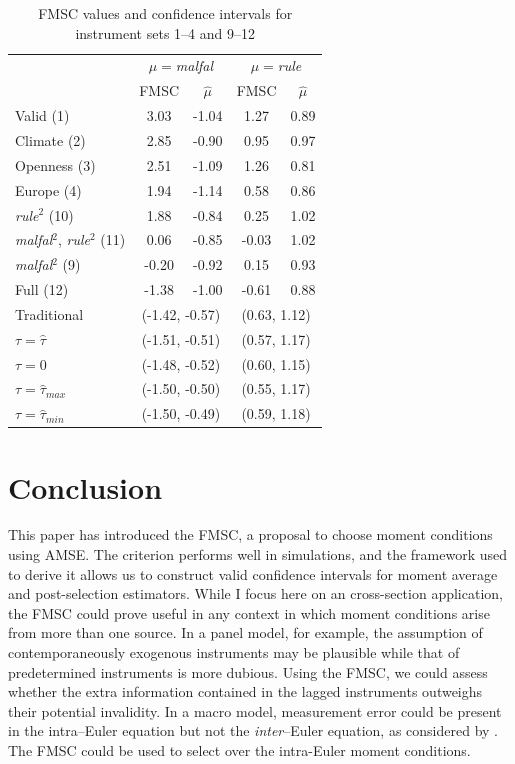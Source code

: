\documentclass[12pt]{article}
\theoremstyle{definition}
\begin{document}
\begin{table}[htbp]
\caption{FMSC values and confidence intervals for instrument sets 1--4 and 9--12}
\label{tab:all}
\small
\centering
 \begin{tabular}{lcccc}\hline\hline
 & \multicolumn{2}{c}{$\mu=$\emph{malfal}}& \multicolumn{2}{c}{$\mu=$\emph{rule}}\\
&\multicolumn{1}{c}{FMSC}&\multicolumn{1}{c}{$\widehat{\mu}$}&\multicolumn{1}{c}{FMSC}&\multicolumn{1}{c}{$\widehat{\mu}$}\tabularnewline
\hline
Valid (1)& 3.03&-1.04& 1.27&0.89\tabularnewline
Climate (2)& 2.85&-0.90& 0.95&0.97\tabularnewline
Openness (3)& 2.51&-1.09& 1.26&0.81\tabularnewline
Europe (4)& 1.94&-1.14& 0.58&0.86\tabularnewline
\emph{rule}$^2$ (10)& 1.88&-0.84& 0.25&1.02\tabularnewline
\emph{malfal}$^2$, \emph{rule}$^2$ (11)& 0.06&-0.85&-0.03&1.02\tabularnewline
\emph{malfal}$^2$ (9)&-0.20&-0.92& 0.15&0.93\tabularnewline
Full (12)&-1.38&-1.00&-0.61&0.88\tabularnewline
\hline
Traditional&\multicolumn{2}{c}{(-1.42, -0.57)}&\multicolumn{2}{c}{(0.63, 1.12)}\\
$\tau = \widehat{\tau}$&\multicolumn{2}{c}{(-1.51, -0.51)}&\multicolumn{2}{c}{(0.57, 1.17)}\\
$\tau = 0$&\multicolumn{2}{c}{(-1.48, -0.52)}&\multicolumn{2}{c}{(0.60, 1.15)}\\
$\tau = \widehat{\tau}_{max}$&\multicolumn{2}{c}{(-1.50, -0.50)}&\multicolumn{2}{c}{(0.55, 1.17)}\\
$\tau = \widehat{\tau}_{min}$&\multicolumn{2}{c}{(-1.50, -0.49)}&\multicolumn{2}{c}{(0.59, 1.18)}\\
\hline
\end{tabular}


\footnotesize
\end{table}





\section{Conclusion}
\label{sec:conclude}
This paper has introduced the FMSC, a proposal to choose moment conditions using AMSE. The criterion performs well in simulations, and the framework used to derive it allows us to construct valid confidence intervals for moment average and post-selection estimators.  While I focus here on an cross-section application, the FMSC could prove useful in any context in which moment conditions arise from more than one source. In a panel model, for example, the assumption of contemporaneously exogenous instruments may be plausible while that of predetermined instruments is more dubious. Using the FMSC, we could assess whether the extra information contained in the lagged instruments outweighs their potential invalidity. In a macro model, measurement error could be present in the intra--Euler equation but not the \emph{inter}--Euler equation, as considered by \cite{Eichenbaum}. The FMSC could be used to select over the intra-Euler moment conditions.
\end{document}
